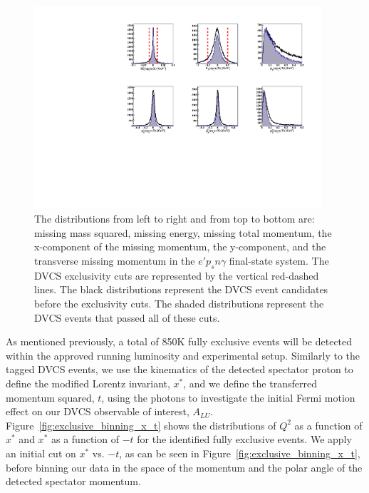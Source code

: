 \begin{figure}[htb]
  \centering
    \includegraphics[width=0.95\textwidth,clip]{figs_epngamma/pdf/epngamma_all_incoh_exc_cuts.pdf}
  \caption{
    The distributions from left to right and from top to bottom are:
    missing mass squared, missing energy, missing total momentum, the 
    x-component of the missing momentum, the y-component, and the transverse 
    missing momentum in the $e'p_{s}n\gamma$ final-state system. The DVCS 
    exclusivity cuts are represented by the vertical red-dashed lines. The 
    black distributions represent the DVCS event candidates before the 
    exclusivity cuts. The shaded distributions represent the DVCS events that 
    passed all of these cuts.
   \label{fig:fully_exclusive}}
\end{figure}

As mentioned previously, a total of 850K fully exclusive events will be 
detected within the approved running luminosity and experimental setup.   
Similarly to the tagged DVCS events, we use the kinematics of the detected 
spectator proton to define the modified Lorentz invariant, $x^*$, and we define 
the transferred momentum squared, $t$, using the photons to investigate the 
initial Fermi motion effect on our DVCS observable of interest, $A_{LU}$.  
Figure~\ref{fig:exclusive_binning_x_t} shows the distributions of  $Q^2$ as a 
function of  $x^*$ and  $x^{*}$ as a function of $-t$ for the identified fully 
exclusive events. We apply an initial cut on $x^{*}$ vs. $-t$, as can be seen 
in Figure~\ref{fig:exclusive_binning_x_t}, before binning our data in the space 
of the momentum and the polar angle of the detected spectator momentum.  

